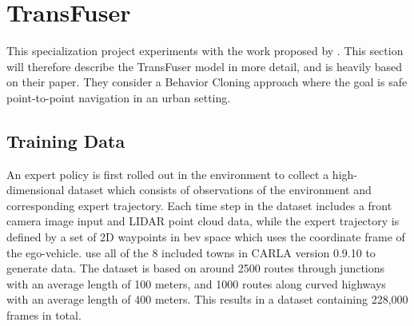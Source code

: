 \section{TransFuser}
\label{sec:transfuser}

This specialization project experiments with the work proposed by \textcite{transfuser-pami}. This section will therefore describe the TransFuser model in more detail, and is heavily based on their paper. They consider a  Behavior Cloning approach where the goal is safe point-to-point navigation in an urban setting. 

\subsection{Training Data}
An expert policy is first rolled out in the environment to collect a high-dimensional dataset which consists of observations of the environment and corresponding expert trajectory. Each time step in the dataset includes a front camera image input and LIDAR point cloud data, while the expert trajectory is defined by a set of 2D waypoints in \acrfull{bev} space which uses the coordinate frame of the ego-vehicle. \textcite{transfuser-pami} use all of the 8 included towns in CARLA version 0.9.10 to generate data. The dataset is based on around 2500 routes through junctions with an average length of 100 meters, and 1000 routes along curved highways with an average length of 400 meters. This results in a dataset containing 228,000 frames in total.

